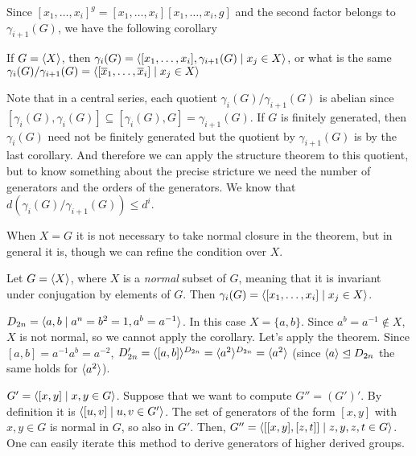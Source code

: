 \documentclass[twoside, 11pt]{article}
\begin{document}
Since $[x_1,\dots, x_i]^g=[x_1,\dots, x_i][x_1,\dots, x_i,g]$ and the second factor belongs to $\gamma_{i+1}(G)$, we have the following corollary

\begin{coro}
If $G=\langle{X}\rangle$, then $\gamma_i(G)=\langle{[x_1,\dots, x_i],\gamma_{i+1}(G)\mid x_j\in X}\rangle$, or what is the same $\gamma_i(G)/\gamma_{i+1}(G)=\langle{[\overline{x}_1,\dots, \overline{x}_i]\mid x_j\in X}\rangle$
\end{coro}

Note that in a central series, each quotient $\gamma_i(G)/\gamma_{i+1}(G)$ is abelian since $[\gamma_i(G),\gamma_i(G)]\subseteq [\gamma_i(G),G]=\gamma_{i+1}(G)$. If $G$ is finitely generated, then $\gamma_i(G)$ need not be finitely generated but the quotient by $\gamma_{i+1}(G)$ is by the last corollary. And therefore we can apply the structure theorem to this quotient, but to know something about the precise stricture we need the number of generators and the orders of the generators. We know that $d\left(\gamma_i(G)/\gamma_{i+1}(G)\right)\leq d^i$.

When $X=G$ it is not necessary to take normal closure in the theorem, but in general it is, though we can refine the condition over $X$.

\begin{coro}
Let $G=\langle{X}\rangle$, where $X$ is a \emph{normal} subset of $G$, meaning that it is invariant under conjugation by elements of $G$. Then $\gamma_i(G)=\langle{[x_1,\dots, x_i]\mid x_j\in X}\rangle$.
\end{coro}

\begin{ej}
$D_{2n}=\langle{a,b\mid a^n=b^2=1, a^b=a^{-1}}\rangle$. In this case $X=\{a,b\}$. Since $a^b=a^{-1}\notin X$, $X$ is not normal, so we cannot apply the corollary. Let's apply the theorem. Since $[a,b]=a^{-1}a^b=a^{-2}$, $D'_{2n}=\langle{[a,b]}\rangle^{D_{2n}}=\langle{a^2}\rangle^{D_{2n}}=\langle{a^2}\rangle$ (since $\langle{a}\rangle\trianglelefteq D_{2n}$ the same holds for $\langle{a^2}\rangle$).
\end{ej}

\begin{ej}
$G'=\langle{[x,y]\mid x,y\in G}\rangle$. Suppose that we want to compute $G''=(G')'$. By definition it is $\langle{[u,v]\mid u,v\in G'}\rangle$. The set of generators of the form $[x,y]$ with $x,y\in G$ is normal in $G$, so also in $G'$. Then, $G''=\langle{[[x,y],[z,t]]\mid z,y,z,t\in G}\rangle$. One can easily iterate this method to derive generators of higher derived groups.
\end{ej}
\end{document}
